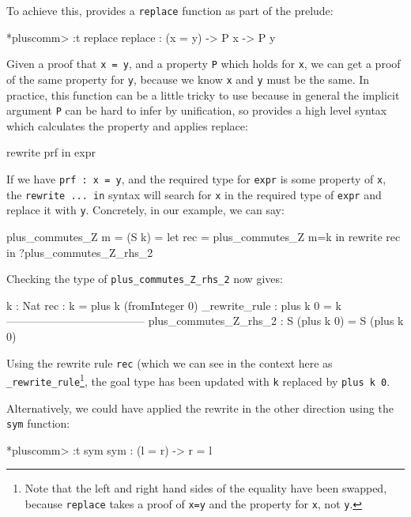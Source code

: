 To achieve this, \Idris{} provides a \texttt{replace} function as part of the
prelude:

\begin{code}
*pluscomm> :t replace
replace : (x = y) -> P x -> P y
\end{code}

\noindent
Given a proof that \texttt{x = y}, and a property \texttt{P} which holds for
\texttt{x}, we can get a proof of the same property for \texttt{y}, because
we know \texttt{x} and \texttt{y} must be the same. In practice, this function
can be a little tricky to use because in general the implicit argument
\texttt{P} can be hard to infer by unification, so \Idris{} provides a
high level syntax which calculates the property and applies replace:

\begin{code}
rewrite prf in expr
\end{code}

\noindent
If we have \texttt{prf : x = y}, and the required type for \texttt{expr} is
some property of \texttt{x}, the \texttt{rewrite ... in} syntax will search
for \texttt{x} in the required type of \texttt{expr} and replace it with
\texttt{y}. Concretely, in our example, we can say:

\begin{code}
plus_commutes_Z {m = (S k)} = let rec = plus_commutes_Z {m=k} in
                                  rewrite rec in ?plus_commutes_Z_rhs_2
\end{code}

\noindent
Checking the type of \texttt{plus\_commutes\_Z\_rhs\_2} now gives:

\begin{code}
  k : Nat
  rec : k = plus k (fromInteger 0)
  _rewrite_rule : plus k 0 = k
--------------------------------------
plus_commutes_Z_rhs_2 : S (plus k 0) = S (plus k 0)
\end{code}

\noindent
Using the rewrite rule \texttt{rec} (which we can see in the context here as
\texttt{\_rewrite\_rule}\footnote{Note that the left and right hand sides of the
equality have been swapped, because \texttt{replace} takes a proof of
\texttt{x=y} and the property for \texttt{x}, not \texttt{y}.}, the goal type
has been updated with \texttt{k} replaced by \texttt{plus k 0}.

Alternatively, we could have applied the rewrite in the other direction using
the \texttt{sym} function:

\begin{code}
*pluscomm> :t sym
sym : (l = r) -> r = l
\end{code}

